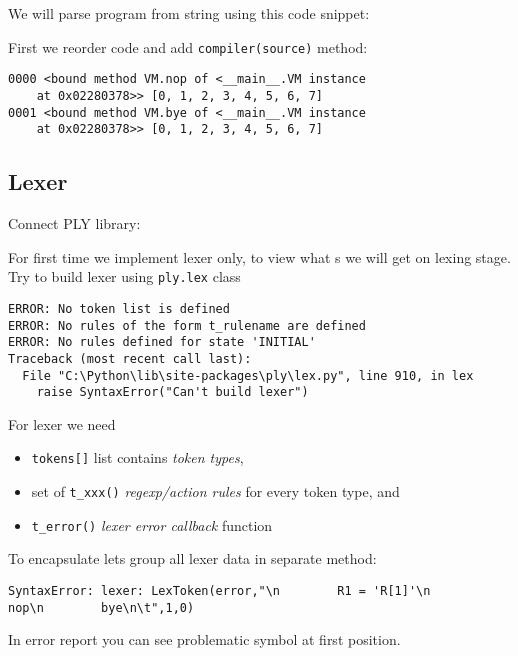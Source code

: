 
We will parse program from string using this code snippet:


First we reorder code and add \verb|compiler(source)| method:

\begin{lstlisting}
0000 <bound method VM.nop of <__main__.VM instance
	at 0x02280378>> [0, 1, 2, 3, 4, 5, 6, 7]
0001 <bound method VM.bye of <__main__.VM instance
	at 0x02280378>> [0, 1, 2, 3, 4, 5, 6, 7]
\end{lstlisting}

\subsection{Lexer}

Connect PLY library:


For first time we implement lexer only, to view what s we will get
on lexing stage. Try to build lexer using \verb|ply.lex| class

\begin{lstlisting}
ERROR: No token list is defined
ERROR: No rules of the form t_rulename are defined
ERROR: No rules defined for state 'INITIAL'
Traceback (most recent call last):
  File "C:\Python\lib\site-packages\ply\lex.py", line 910, in lex
    raise SyntaxError("Can't build lexer")
\end{lstlisting}

For lexer we need 
\begin{itemize}
  \item \verb|tokens[]| list contains \emph{token types}, 
  \item set of \verb|t_xxx()| \emph{regexp/action rules} for every token type,
  and
  \item \verb|t_error()| \emph{lexer error callback} function 
\end{itemize}
To encapsulate lets group all lexer data in separate method:



\begin{lstlisting}
SyntaxError: lexer: LexToken(error,"\n        R1 = 'R[1]'\n        nop\n        bye\n\t",1,0)
\end{lstlisting}

In error report you can see problematic symbol at first position.

